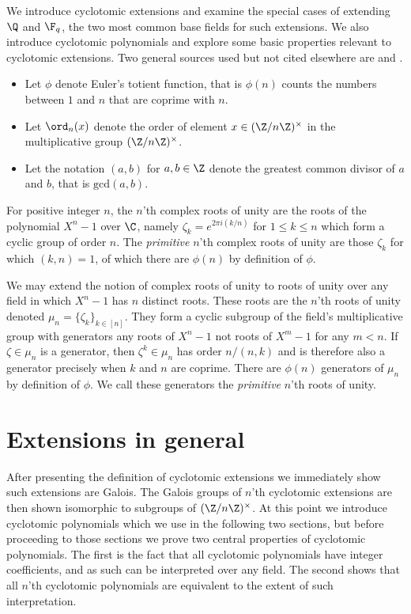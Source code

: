 
We introduce cyclotomic extensions and examine the special cases of extending $\Q$ and $\F_q$, the two most common base fields for such extensions.
We also introduce cyclotomic polynomials and explore some basic properties relevant to cyclotomic extensions.
Two general sources used but not cited elsewhere are \cite{Mor96} and \cite{Conrad}.

\begin{itemize}
    \item
    Let $\phi$ denote Euler's totient function, that is $\phi(n)$ counts the numbers between $1$ and $n$ that are coprime with $n$.
    \item
    Let $\ord_n(x)$ denote the order of element $x\in(\Z/n\Z)^\times$ in the multiplicative group $(\Z/n\Z)^\times$.
    \item
    Let the notation $(a,b)$ for $a,b\in\Z$ denote the greatest common divisor of $a$ and $b$, that is $\text{gcd}(a,b)$.
\end{itemize}

For positive integer $n$, the $n$'th complex roots of unity are the roots of the polynomial $X^n-1$ over $\C$, namely $\zeta_k = e^{2\pi i(k/n)}$ for $1\leq k\leq n$ which form a cyclic group of order $n$.
The \emph{primitive} $n$'th complex roots of unity are those $\zeta_k$ for which $(k,n)=1$, of which there are $\phi(n)$ by definition of $\phi$.

We may extend the notion of complex roots of unity to roots of unity over any field in which $X^n-1$ has $n$ distinct roots.
These roots are the  $n$'th roots of unity denoted $\mu_n=\{\zeta_k\}_{k\in[n]}$.
They form a cyclic subgroup of the field's multiplicative group with generators any roots of $X^n-1$ not roots of $X^m-1$ for any $m<n$.
If $\zeta\in\mu_n$ is a generator, then $\zeta^k\in\mu_n$ has order $n/(n,k)$ and is therefore also a generator precisely when $k$ and $n$ are coprime.
There are $\phi(n)$ generators of $\mu_n$ by definition of $\phi$.
We call these generators the \emph{primitive} $n$'th roots of unity.


\section{Extensions in general}

After presenting the definition of cyclotomic extensions we immediately show such extensions are Galois.
The Galois groups of $n$'th cyclotomic extensions are then shown isomorphic to subgroups of $(\Z/n\Z)^\times$.
At this point we introduce cyclotomic polynomials which we use in the following two sections, but before proceeding to those sections we prove two central properties of cyclotomic polynomials.
The first is the fact that all cyclotomic polynomials have integer coefficients, and as such can be interpreted over any field.
The second shows that all $n$'th cyclotomic polynomials are equivalent to the extent of such interpretation.

